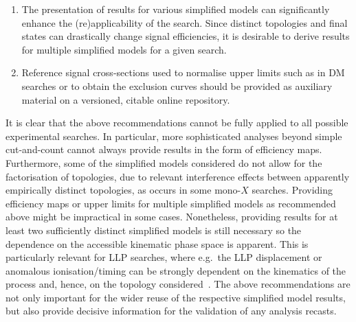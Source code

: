 \documentclass[a4paper,aps,prd,longbibliography,notitlepage,showpacs,amsmath,amssymb,superscriptaddress,nofootinbib,floatfix,11pt,preprintnumbers]{revtex4-1-mod}
\newcommand{\hepdata}{\textsf{HEPData}\xspace}
\newcommand{\eg}{e.g.\xspace}
\begin{document}
\begin{enumerate}
\item The presentation of results for various simplified models can significantly enhance the (re)applicability of the search. Since distinct topologies and final states can drastically change signal efficiencies, it is desirable to derive results for multiple simplified models for a given search.

\item Reference signal cross-sections used to normalise upper limits such as in DM searches or to obtain the exclusion curves should be provided as auxiliary material on a versioned, citable online repository. 


\end{enumerate}

It is clear that the above recommendations cannot be fully applied to all possible experimental searches. In particular, more sophisticated analyses beyond simple cut-and-count cannot always provide results in the form of efficiency maps.
%
Furthermore, some of the simplified models considered do not allow for the factorisation of topologies, due to relevant interference effects between apparently empirically distinct topologies, as occurs in some mono-$X$ searches.
Providing efficiency maps or upper limits for multiple simplified models as recommended above might be impractical in some cases.
Nonetheless, providing results for at least two sufficiently distinct simplified models is still necessary so the dependence on the accessible kinematic phase space is apparent. 
This is particularly relevant for LLP searches, where \eg~the LLP displacement or anomalous ionisation/timing can be strongly dependent on the kinematics of the process and, hence, on the topology considered~\cite{Heisig:2015yla}.
%
The above recommendations are not only important for the wider reuse of the respective simplified model results, but also provide decisive information for the validation of any analysis recasts.

\end{document}

